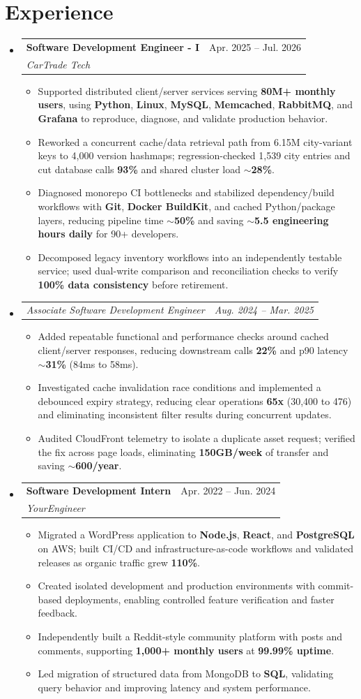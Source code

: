 \documentclass[letterpaper,11pt]{article}
\makeatletter
\newcommand{\resumeItem}[1]{
  \item\small{
    {#1 \vspace{-2pt}}
  }
}
\newcommand{\resumeSubheading}[4]{
  \vspace{-2pt}\item
    \begin{tabular*}{0.97\textwidth}[t]{l@{\extracolsep{\fill}}r}
      \textbf{#1} & #2 \\
      \textit{\small#3} & \textit{\small #4} \\
    \end{tabular*}\vspace{-7pt}
}
\newcommand{\resumeSubSubheading}[2]{
    \item
    \begin{tabular*}{0.97\textwidth}{l@{\extracolsep{\fill}}r}
      \textit{\small#1} & \textit{\small #2} \\
    \end{tabular*}\vspace{-7pt}
}
\newcommand{\resumeSubHeadingListStart}{\begin{itemize}[leftmargin=0.15in, label={}]}
\newcommand{\resumeSubHeadingListEnd}{\end{itemize}}
\newcommand{\resumeItemListStart}{\begin{itemize}}
\newcommand{\resumeItemListEnd}{\end{itemize}\vspace{-5pt}}
\makeatother
\begin{document}
\section{Experience}
\resumeSubHeadingListStart
\resumeSubheading
{Software Development Engineer - I}{Apr. 2025 -- Jul. 2026}
{CarTrade Tech}{ }
\resumeItemListStart
\resumeItem{Supported distributed client/server services serving \textbf{80M+ monthly users}, using \textbf{Python}, \textbf{Linux}, \textbf{MySQL}, \textbf{Memcached}, \textbf{RabbitMQ}, and \textbf{Grafana} to reproduce, diagnose, and validate production behavior.}
\resumeItem{Reworked a concurrent cache/data retrieval path from 6.15M city-variant keys to 4,000 version hashmaps; regression-checked 1,539 city entries and cut database calls \textbf{93\%} and shared cluster load \textbf{$\sim$28\%}.}
\resumeItem{Diagnosed monorepo CI bottlenecks and stabilized dependency/build workflows with \textbf{Git}, \textbf{Docker BuildKit}, and cached Python/package layers, reducing pipeline time \textbf{$\sim$50\%} and saving \textbf{$\sim$5.5 engineering hours daily} for 90+ developers.}
\resumeItem{Decomposed legacy inventory workflows into an independently testable service; used dual-write comparison and reconciliation checks to verify \textbf{100\% data consistency} before retirement.}
\resumeItemListEnd
\resumeSubSubheading
{Associate Software Development Engineer}{Aug. 2024 -- Mar. 2025}
\resumeItemListStart
\resumeItem{Added repeatable functional and performance checks around cached client/server responses, reducing downstream calls \textbf{22\%} and p90 latency \textbf{$\sim$31\%} (84ms to 58ms).}
\resumeItem{Investigated cache invalidation race conditions and implemented a debounced expiry strategy, reducing clear operations \textbf{65x} (30,400 to 476) and eliminating inconsistent filter results during concurrent updates.}
\resumeItem{Audited CloudFront telemetry to isolate a duplicate asset request; verified the fix across page loads, eliminating \textbf{150GB/week} of transfer and saving \textbf{$\sim$600/year}.}
\resumeItemListEnd
\resumeSubheading
{Software Development Intern}{Apr. 2022 -- Jun. 2024}
{YourEngineer}{ }
\resumeItemListStart
\resumeItem{Migrated a WordPress application to \textbf{Node.js}, \textbf{React}, and \textbf{PostgreSQL} on AWS; built CI/CD and infrastructure-as-code workflows and validated releases as organic traffic grew \textbf{110\%}.}
\resumeItem{Created isolated development and production environments with commit-based deployments, enabling controlled feature verification and faster feedback.}
\resumeItem{Independently built a Reddit-style community platform with posts and comments, supporting \textbf{1,000+ monthly users} at \textbf{99.99\% uptime}.}
\resumeItem{Led migration of structured data from MongoDB to \textbf{SQL}, validating query behavior and improving latency and system performance.}
\resumeItemListEnd
\resumeSubHeadingListEnd
\end{document}
